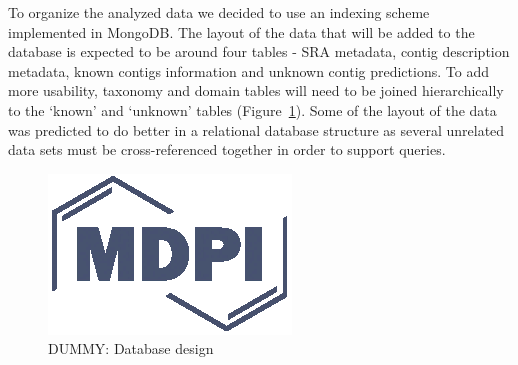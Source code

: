   To organize the analyzed data we decided to use an indexing scheme
  implemented in MongoDB. The layout of the data that will be added to the
  database is expected to be around four tables - SRA metadata, contig
  description metadata, known contigs information and unknown contig
  predictions. To add more usability, taxonomy and domain tables will need to
  be joined hierarchically to the ‘known’ and ‘unknown’ tables
  (Figure~\ref{fig:db_design}). Some of the layout of the data was predicted to
  do better in a relational database structure as several unrelated data sets
  must be cross-referenced together in order to support queries.

  \begin{figure}
    \centering
    \includegraphics{Definitions/logo-mdpi}
    \caption{DUMMY: Database design
            \label{fig:db_design}}
  \end{figure}
